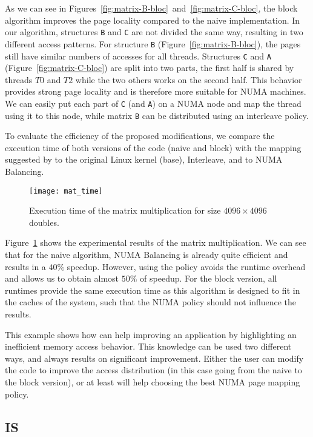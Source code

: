 As we can see in Figures~\ref{fig:matrix-B-bloc}~and~\ref{fig:matrix-C-bloc}, the block algorithm improves the page
locality compared to the naive implementation. In our algorithm, structures \texttt{B}
and \texttt{C} are not divided the same way, resulting in two different access patterns. For structure \texttt{B} (Figure~\ref{fig:matrix-B-bloc}), the pages still
have similar numbers of accesses for all threads. Structures \texttt{C} and
\texttt{A} (Figure~\ref{fig:matrix-C-bloc}) are split into two parts, the first half
is shared by threads $T0$ and $T2$ while the two others works on the second
half. This behavior provides strong page locality and is therefore more
suitable for NUMA machines. We can easily put each part of \texttt{C} (and
\texttt{A}) on a NUMA node and map the thread using it to this node, while matrix
\texttt{B} can be distributed using an interleave policy.

To evaluate the efficiency of the proposed modifications, we compare the execution
time of both versions of the code (naive and block) with the mapping suggested by \TABARNAC to the original Linux kernel (base), Interleave, and to NUMA Balancing.


\begin{figure}[!t]
    \centering
    \texttt{[image: mat\_time]}
    \caption{Execution time of the matrix multiplication for size $4096\times 4096$ doubles.}
    \label{fig:matrix-res}
\end{figure}

Figure~\ref{fig:matrix-res} shows the experimental results of the matrix multiplication. We can see that for
the naive algorithm, NUMA Balancing is already quite efficient and results in a $40\%$
speedup. However, using the \TABARNAC policy avoids the runtime overhead and
allows us to obtain almost $50\%$ of speedup. For the block version, all runtimes
provide the same execution time as this algorithm is designed to fit in the
caches of the system, such that the NUMA policy should not influence the results.

This example shows
how \TABARNAC can help improving an application by highlighting an inefficient
memory access behavior. This knowledge can be used two different ways, and always
results on significant improvement. Either the user can modify the code to
improve the access distribution (in this case going from the naive to the block version),
or at least \TABARNAC will help choosing the best NUMA page mapping policy.

\subsection{IS}
\label{sec:exp-is}

